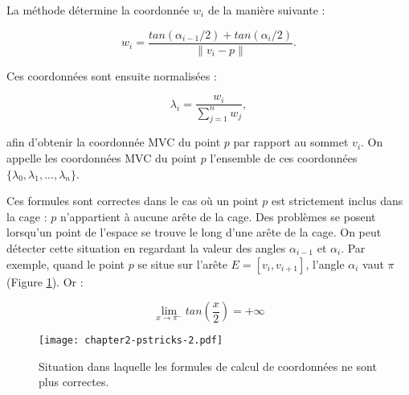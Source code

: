 La méthode détermine la coordonnée $w_i$ de la manière suivante :

\begin{equation}
  w_i = \frac{tan(\alpha_{i-1}/2) + tan(\alpha_i/2)}{\| v_i - p \|}.
  \label{DEFcoo}
\end{equation}

Ces coordonnées sont ensuite normalisées :

\begin{equation}
  \lambda_i = \frac{w_i}{\sum_{j=1}^n w_j},
\end{equation}

afin d'obtenir la coordonnée MVC du point $p$ par rapport au sommet $v_i$. On
appelle les coordonnées MVC du point $p$ l'ensemble de ces coordonnées
$\{\lambda_0, \lambda_1, ..., \lambda_n\}$.





Ces formules sont correctes dans le cas où un point $p$ est strictement inclus
dans la cage : $p$ n'appartient à aucune arête de la cage. Des problèmes se
posent lorsqu'un point de l'espace se trouve le long d'une arête de la cage.
On peut détecter cette situation en regardant la valeur des angles
$\alpha_{i-1}$ et $\alpha_i$. Par exemple, quand le point $p$ se situe sur
l'arête $E = [v_i,v_{i+1}]$, l'angle $\alpha_i$ vaut $\pi$ (Figure
\ref{DEFinc}). Or :

\begin{displaymath}
  \lim\limits_{x \to \pi^-} tan(\frac{x}{2}) = +\infty
\end{displaymath}

\begin{figure}[ht]
  \begin{center}
    \texttt{[image: chapter2-pstricks-2.pdf]}

    \caption[Cas particulier MVC] {Situation dans laquelle les
formules de calcul de coordonnées ne sont plus correctes.}

    \label{DEFinc}
  \end{center}
\end{figure}


